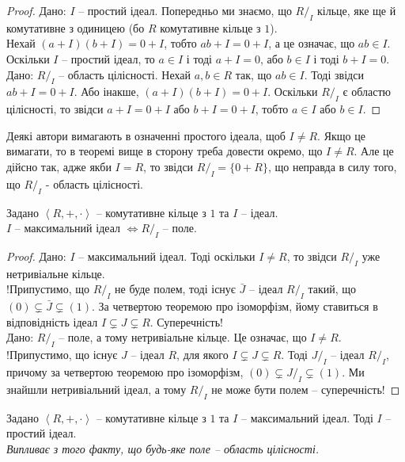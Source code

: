 \documentclass{math_library}
\begin{document}
\begin{proof}
\rightproof Дано: $I$ -- простий ідеал. Попередньо ми знаємо, що $R/_I$ кільце, яке ще й комутативне з одиницею (бо $R$ комутативне кільце з $1$). \\
Нехай $(a+I)(b+I) = 0+I$, тобто $ab + I = 0+I$, а це означає, що $ab \in I$. Оскільки $I$ -- простий ідеал, то $a \in I$ і тоді $a+I = 0$, або $b \in I$ і тоді $b+I = 0$.
\bigskip \\
\leftproof Дано: $R/_I$ -- область цілісності. Нехай $a,b \in R$ так, що $ab \in I$. Тоді звідси $ab + I = 0 + I$. Або інакше, $(a+I)(b+I) = 0+I$. Оскільки $R/_I$ є областю цілісності, то звідси $a+I=0+I$ або $b+I=0+I$, тобто $a \in I$ або $b \in I$.
\end{proof}

\begin{remark}
Деякі автори вимагають в означенні простого ідеала, щоб $I \neq R$. Якщо це вимагати, то в теоремі вище в сторону \leftproof треба довести окремо, що $I \neq R$. Але це дійсно так, адже якби $I = R$, то звідси $R/_{I} = \{0+R\}$, що неправда в силу того, що $R/_{I}$ - область цілісності.
\end{remark}

\begin{theorem}
Задано $\left< R,+,\cdot \right>$ -- комутативне кільце з $1$ та $I$ -- ідеал.\\
$I$ -- максимальний ідеал $\iff R/_I$ -- поле.
\end{theorem}

\begin{proof}
\rightproof Дано: $I$ -- максимальний ідеал. Тоді оскільки $I \neq R$, то звідси $R/_I$ уже нетривіальне кільце.\\
!Припустимо, що $R/_I$ не буде полем, тоді існує $\bar{J}$ -- ідеал $R/_I$ такий, що $(0) \subsetneq \bar{J} \subsetneq (1)$. За четвертою теоремою про ізоморфізм, йому ставиться в відповідність ідеал $I \subsetneq J \subsetneq R$. Суперечність!
\bigskip \\
\leftproof Дано: $R/_I$ -- поле, а тому нетривіальне кільце. Це означає, що $I \neq R$.\\
!Припустимо, що існує $J$ -- ідеал $R$, для якого $I \subsetneq J \subsetneq R$. Тоді $J/_I$ -- ідеал $R/_I$, причому за четвертою теоремою про ізоморфізм, $(0) \subsetneq J/_I \subsetneq (1)$. Ми знайшли нетривіальний ідеал, а тому $R/_I$ не може бути полем -- суперечність!
\end{proof}

\begin{proposition}
Задано $\left< R,+,\cdot\right>$ -- комутативне кільце з $1$ та $I$ -- максимальний ідеал. Тоді $I$ -- простий ідеал.\\
\textit{Випливає з того факту, що будь-яке поле -- область цілісності.}
\end{proposition}
\end{document}

